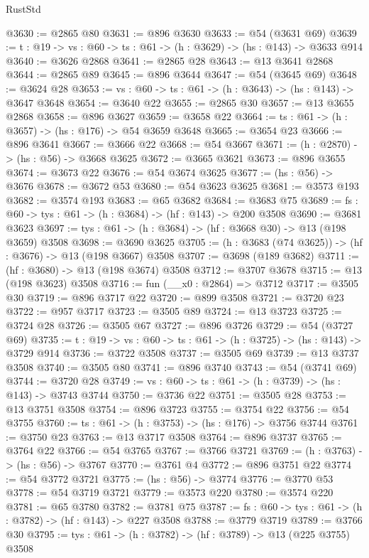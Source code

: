\begin{lexlean}{RustStd}
\begin{coremodule}
@3630 := @2865 @80
@3631 := @896 @3630
@3633 := @54 (@3631 @69)
@3639 := {t : @19} -> {vs : @60} -> {ts : @61} -> (h : @3629) -> (hs : @143) -> @3633 @914
@3640 := @3626 @2868
@3641 := @2865 @28
@3643 := @13 @3641 @2868
@3644 := @2865 @89
@3645 := @896 @3644
@3647 := @54 (@3645 @69)
@3648 := @3624 @28
@3653 := {vs : @60} -> {ts : @61} -> (h : @3643) -> (hs : @143) -> @3647 @3648
@3654 := @3640 @22
@3655 := @2865 @30
@3657 := @13 @3655 @2868
@3658 := @896 @3627
@3659 := @3658 @22
@3664 := {ts : @61} -> (h : @3657) -> (hs : @176) -> @54 @3659 @3648
@3665 := @3654 @23
@3666 := @896 @3641
@3667 := @3666 @22
@3668 := @54 @3667
@3671 := (h : @2870) -> (hs : @56) -> @3668 @3625
@3672 := @3665 @3621
@3673 := @896 @3655
@3674 := @3673 @22
@3676 := @54 @3674 @3625
@3677 := (hs : @56) -> @3676
@3678 := @3672 @53
@3680 := @54 @3623 @3625
@3681 := @3573 @193
@3682 := @3574 @193
@3683 := @65 @3682
@3684 := @3683 @75
@3689 := {fs : @60} -> {tys : @61} -> (h : @3684) -> (hf : @143) -> @200 @3508
@3690 := @3681 @3623
@3697 := {tys : @61} -> (h : @3684) -> (hf : @3668 @30) -> @13 (@198 @3659) @3508
@3698 := @3690 @3625
@3705 := (h : @3683 (@74 @3625)) -> (hf : @3676) -> @13 (@198 @3667) @3508
@3707 := @3698 (@189 @3682)
@3711 := (hf : @3680) -> @13 (@198 @3674) @3508
@3712 := @3707 @3678
@3715 := @13 (@198 @3623) @3508
@3716 := fun (__x0 : @2864) => @3712
@3717 := @3505 @30
@3719 := @896 @3717 @22
@3720 := @899 @3508
@3721 := @3720 @23
@3722 := @957 @3717
@3723 := @3505 @89
@3724 := @13 @3723
@3725 := @3724 @28
@3726 := @3505 @67
@3727 := @896 @3726
@3729 := @54 (@3727 @69)
@3735 := {t : @19} -> {vs : @60} -> {ts : @61} -> (h : @3725) -> (hs : @143) -> @3729 @914
@3736 := @3722 @3508
@3737 := @3505 @69
@3739 := @13 @3737 @3508
@3740 := @3505 @80
@3741 := @896 @3740
@3743 := @54 (@3741 @69)
@3744 := @3720 @28
@3749 := {vs : @60} -> {ts : @61} -> (h : @3739) -> (hs : @143) -> @3743 @3744
@3750 := @3736 @22
@3751 := @3505 @28
@3753 := @13 @3751 @3508
@3754 := @896 @3723
@3755 := @3754 @22
@3756 := @54 @3755
@3760 := {ts : @61} -> (h : @3753) -> (hs : @176) -> @3756 @3744
@3761 := @3750 @23
@3763 := @13 @3717 @3508
@3764 := @896 @3737
@3765 := @3764 @22
@3766 := @54 @3765
@3767 := @3766 @3721
@3769 := (h : @3763) -> (hs : @56) -> @3767
@3770 := @3761 @4
@3772 := @896 @3751 @22
@3774 := @54 @3772 @3721
@3775 := (hs : @56) -> @3774
@3776 := @3770 @53
@3778 := @54 @3719 @3721
@3779 := @3573 @220
@3780 := @3574 @220
@3781 := @65 @3780
@3782 := @3781 @75
@3787 := {fs : @60} -> {tys : @61} -> (h : @3782) -> (hf : @143) -> @227 @3508
@3788 := @3779 @3719
@3789 := @3766 @30
@3795 := {tys : @61} -> (h : @3782) -> (hf : @3789) -> @13 (@225 @3755) @3508

\end{coremodule}
\end{lexlean}
